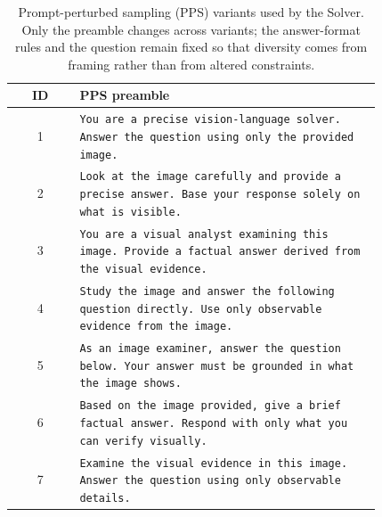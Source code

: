 \documentclass[runningheads]{llncs}
\begin{document}
\begin{table}[!htb]
  \centering
  \small
  \setlength{\tabcolsep}{4pt}
  \renewcommand{\arraystretch}{1.05}
  \caption{Prompt-perturbed sampling (PPS) variants used by the Solver. Only the preamble changes across variants; the answer-format rules and the question remain fixed so that diversity comes from framing rather than from altered constraints.}
  \label{tab:sup_pps_templates}
  \begin{tabular}{@{}cp{0.82\linewidth}@{}}
    \toprule
    ID & PPS preamble \\
    \midrule
    1 & \texttt{You are a precise vision-language solver. Answer the question using only the provided image.} \\
    2 & \texttt{Look at the image carefully and provide a precise answer. Base your response solely on what is visible.} \\
    3 & \texttt{You are a visual analyst examining this image. Provide a factual answer derived from the visual evidence.} \\
    4 & \texttt{Study the image and answer the following question directly. Use only observable evidence from the image.} \\
    5 & \texttt{As an image examiner, answer the question below. Your answer must be grounded in what the image shows.} \\
    6 & \texttt{Based on the image provided, give a brief factual answer. Respond with only what you can verify visually.} \\
    7 & \texttt{Examine the visual evidence in this image. Answer the question using only observable details.} \\
    \bottomrule
  \end{tabular}
\end{table}
\end{document}

